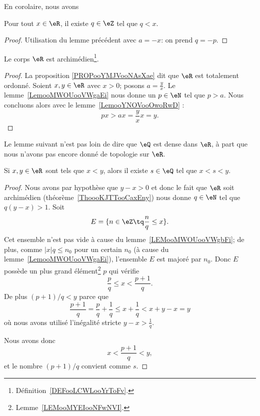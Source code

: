 En corolaire, nous avons
\begin{lemma}      \label{LEMooMWOUooVWgbFi}
	Pour tout \( x\in \eR\), il existe \( q\in \eZ\) tel que \( q < x\).
\end{lemma}
\begin{proof}
	Utilisation du lemme précédent avec \( a = -x \): on prend \( q = -p \).
\end{proof}

\begin{theorem}        \label{ThoooKJTTooCaxEny}
	Le corps \( \eR\) est archimédien\footnote{Définition~\ref{DEFooLCWLooYrToFv}.}.
\end{theorem}

\begin{proof}
	La proposition \ref{PROPooYMJVooNAsXae} dit que \( \eR\) est totalement ordonné. Soient \( x,y\in \eR\) avec \( x>0\); posons \( a=\frac{ y }{ x }\). Le lemme~\ref{LemooMWOUooVWgaEi} nous donne un \( p \in \eN\) tel que \(p > a\). Nous concluons alors avec le lemme~\ref{LemooYNOVooOwoRwD} :
	\begin{equation}
		px>ax=\frac{ y }{ x }x=y.
	\end{equation}
\end{proof}

Le lemme suivant n'est pas loin de dire que \( \eQ\) est dense dans \( \eR\), à part que nous n'avons pas encore donné de topologie sur \( \eR\).
\begin{lemma}       \label{LemooHLHTooTyCZYL}
	Si \( x,y\in \eR\) sont tels que \( x<y\), alors il existe \( s\in \eQ\) tel que \( x<s<y\).
\end{lemma}

\begin{proof}
	Nous avons par hypothèse que \( y-x>0\) et donc le fait que \( \eR\) soit archimédien (théorème~\ref{ThoooKJTTooCaxEny}) nous donne \( q\in \eN\) tel que \( q(y-x)>1\). Soit
	\begin{equation}
		E=\{ n\in \eZ\tq \frac{ n }{ q }\leq x \}.
	\end{equation}
	Cet ensemble n'est pas vide à cause du lemme~\ref{LEMooMWOUooVWgbFi}; de plus, comme \( |x|q \leq n_0\) pour un certain \( n_0 \) (à cause du lemme~\ref{LemooMWOUooVWgaEi}), l'ensemble \( E\) est majoré par \( n_0\). Donc \( E\) possède un plus grand élément\footnote{Lemme~\ref{LEMooMYEIooNFwNVI}.} \( p\) qui vérifie
	\begin{equation}
		\frac{ p }{ q }\leq x<\frac{ p+1 }{ q }.
	\end{equation}
	De plus \( (p+1)/q<y\) parce que
	\begin{equation}
		\frac{ p+1 }{ q }=\frac{ p }{ q }+\frac{1}{ q }\leq x+\frac{1}{ q }<x+y-x=y
	\end{equation}
	où nous avons utilisé l'inégalité stricte \( y-x>\frac{1}{ q }\).

	Nous avons donc
	\begin{equation}
		x<\frac{ p+1 }{ q }<y,
	\end{equation}
	et le nombre \( (p+1)/q\) convient comme \( s\).
\end{proof}

